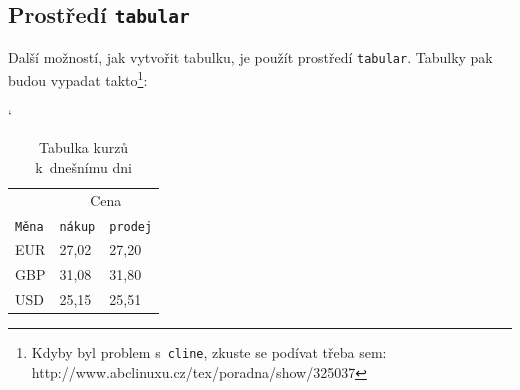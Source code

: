 \documentclass[11pt,titlepage,a4paper]{article}
\begin{document}
\subsection{Prostředí \texttt{tabular}}

Další možností, jak vytvořit tabulku, je použít prostředí \texttt{tabular}. Tabulky pak 
budou vypadat takto\footnote{Kdyby byl problem s~\texttt{cline}, zkuste se podívat třeba sem: 
http://www.abclinuxu.cz/tex/poradna/show/325037}: \\[2mm]

\begin{table}[ht]
\catcode`
\centering
\begin{tabular}{|l|l|l|} 
\hline
     & \multicolumn{2}{c|}{Cena}           \\ 
\cline{2-2}\cline{3-3}
\texttt{Měna} & \texttt{nákup}   & \texttt{prodej}  \\ 
\hline
EUR  & 27,02                     & 27,20   \\
GBP  & 31,08                     & 31,80   \\
USD  & 25,15                     & 25,51   \\
\hline
\end{tabular}
\caption{Tabulka kurzů k~dnešnímu dni}
\label{tab1}
\end{table}

\end{document}
